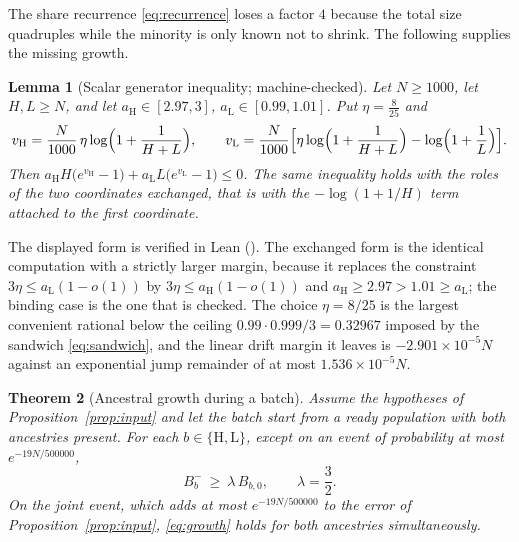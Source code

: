 \documentclass[11pt,a4paper]{article}
\theoremstyle{plain}
\newtheorem{theorem}{Theorem}[section]
\newtheorem{lemma}[theorem]{Lemma}
\theoremstyle{definition}
\theoremstyle{remark}
\newcommand{\lo}{\mathrm L}
\newcommand{\hi}{\mathrm H}
\begin{document}
The share recurrence \eqref{eq:recurrence} loses a factor $4$ because the total
size quadruples while the minority is only known not to shrink. The following
supplies the missing growth.

\begin{lemma}[Scalar generator inequality; machine-checked]\label{lem:scalar}
Let $N\ge1000$, let $H,L\ge N$, and let $a_\hi\in[2.97,3]$,
$a_\lo\in[0.99,1.01]$. Put $\eta=\frac8{25}$ and
\[
v_\hi=\frac N{1000}\,\eta\log\Bigl(1+\frac1{H+L}\Bigr),\qquad
v_\lo=\frac N{1000}\Bigl[\eta\log\Bigl(1+\frac1{H+L}\Bigr)-\log\Bigl(1+\frac1L\Bigr)\Bigr].
\]
Then
$a_\hi H\bigl(e^{v_\hi}-1\bigr)+a_\lo L\bigl(e^{v_\lo}-1\bigr)\le0$.
The same inequality holds with the roles of the two coordinates exchanged, that
is with the $-\log(1+1/H)$ term attached to the first coordinate.
\end{lemma}

The displayed form is verified in Lean
(). The exchanged
form is the identical computation with a strictly larger margin, because it
replaces the constraint $3\eta\le a_\lo(1-o(1))$ by $3\eta\le a_\hi(1-o(1))$ and
$a_\hi\ge2.97>1.01\ge a_\lo$; the binding case is the one that is checked. The
choice $\eta=8/25$ is the largest convenient rational below the ceiling
$0.99\cdot0.999/3=0.32967$ imposed by the sandwich \eqref{eq:sandwich}, and the
linear drift margin it leaves is $-2.901\times10^{-5}N$ against an exponential
jump remainder of at most $1.536\times10^{-5}N$.

\begin{theorem}[Ancestral growth during a batch]\label{thm:growth}
Assume the hypotheses of Proposition~\ref{prop:input} and let the batch start
from a ready population with both ancestries present. For each
$b\in\{\hi,\lo\}$, except on an event of probability at most $e^{-19N/500000}$,
\begin{equation}\label{eq:growth}
B_b^-\ \ge\ \lambda\,B_{b,0},\qquad \lambda=\frac32 .
\end{equation}
On the joint event, which adds at most $e^{-19N/500000}$ to the error of
Proposition~\ref{prop:input}, \eqref{eq:growth} holds for both ancestries
simultaneously.
\end{theorem}
\end{document}
